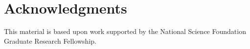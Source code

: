 \documentclass[10pt,letterpaper]{article}
\begin{document}
\section{Acknowledgments}
This material is based upon work supported by the National Science Foundation Graduate Research Fellowship. 



\setlength{\bibleftmargin}{.125in}
\setlength{\bibindent}{-\bibleftmargin}


\end{document}
